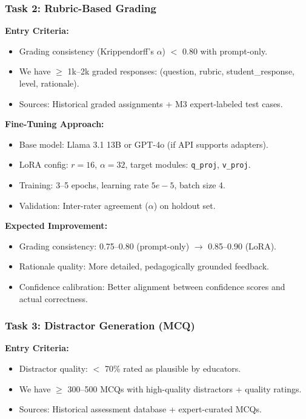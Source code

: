 \documentclass[11pt,letterpaper]{article}
\begin{document}
\subsubsection{Task 2: Rubric-Based Grading}

\textbf{Entry Criteria:}
\begin{itemize}
\item Grading consistency (Krippendorff's $\alpha$) $<$ 0.80 with prompt-only.
\item We have $\geq$ 1k--2k graded responses: (question, rubric, student\_response, level, rationale).
\item Sources: Historical graded assignments + M3 expert-labeled test cases.
\end{itemize}

\textbf{Fine-Tuning Approach:}
\begin{itemize}
\item Base model: Llama 3.1 13B or GPT-4o (if API supports adapters).
\item LoRA config: $r=16$, $\alpha=32$, target modules: \texttt{q\_proj}, \texttt{v\_proj}.
\item Training: 3--5 epochs, learning rate $5e-5$, batch size 4.
\item Validation: Inter-rater agreement ($\alpha$) on holdout set.
\end{itemize}

\textbf{Expected Improvement:}
\begin{itemize}
\item Grading consistency: 0.75--0.80 (prompt-only) $\rightarrow$ 0.85--0.90 (LoRA).
\item Rationale quality: More detailed, pedagogically grounded feedback.
\item Confidence calibration: Better alignment between confidence scores and actual correctness.
\end{itemize}

\subsubsection{Task 3: Distractor Generation (MCQ)}

\textbf{Entry Criteria:}
\begin{itemize}
\item Distractor quality: $<$ 70\% rated as plausible by educators.
\item We have $\geq$ 300--500 MCQs with high-quality distractors + quality ratings.
\item Sources: Historical assessment database + expert-curated MCQs.
\end{itemize}
\end{document}
